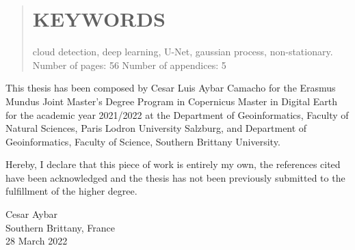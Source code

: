 \documentclass[a4paper, nobind]{templates/cdethesis}
\begin{document}
\begin{romanpages}
\begin{abstract}
 \mbox{}
 \vfill

 \section*{KEYWORDS}

 \noindent cloud detection, deep learning, U-Net, gaussian process, non-stationary. \newline
 Number of pages: 56 \newline
 Number of appendices: 5 \newline
\end{abstract}






\renewcommand{\declarationtitle}{Declaration}
\begin{declaration}
	This thesis has been composed by Cesar Luis Aybar Camacho for the Erasmus
 Mundus Joint Master's Degree Program in Copernicus Master in Digital Earth for the
 academic year 2021/2022 at the Department of Geoinformatics, Faculty of Natural
 Sciences, Paris Lodron University Salzburg, and Department of Geoinformatics, Faculty
 of Science, Southern Brittany University.

 Hereby, I declare that this piece of work is entirely my own, the references cited have
 been acknowledged and the thesis has not been previously submitted to the fulfillment of
 the higher degree.

 \begin{flushright}
 Cesar Aybar \\
 Southern Brittany, France \\
 28 March 2022
 \end{flushright}
\end{declaration}





\end{romanpages}
\end{document}
